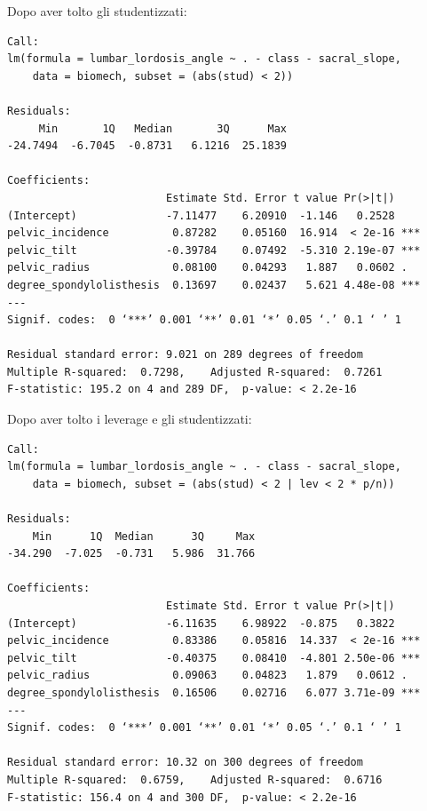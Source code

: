 \documentclass{beamer}
\begin{document}
\begin{frame}[fragile]
	Dopo aver tolto gli studentizzati:

	{\tiny
	\begin{verbatim}
Call:
lm(formula = lumbar_lordosis_angle ~ . - class - sacral_slope, 
    data = biomech, subset = (abs(stud) < 2))

Residuals:
     Min       1Q   Median       3Q      Max 
-24.7494  -6.7045  -0.8731   6.1216  25.1839 

Coefficients:
                         Estimate Std. Error t value Pr(>|t|)    
(Intercept)              -7.11477    6.20910  -1.146   0.2528    
pelvic_incidence          0.87282    0.05160  16.914  < 2e-16 ***
pelvic_tilt              -0.39784    0.07492  -5.310 2.19e-07 ***
pelvic_radius             0.08100    0.04293   1.887   0.0602 .  
degree_spondylolisthesis  0.13697    0.02437   5.621 4.48e-08 ***
---
Signif. codes:  0 ‘***’ 0.001 ‘**’ 0.01 ‘*’ 0.05 ‘.’ 0.1 ‘ ’ 1

Residual standard error: 9.021 on 289 degrees of freedom
Multiple R-squared:  0.7298,	Adjusted R-squared:  0.7261 
F-statistic: 195.2 on 4 and 289 DF,  p-value: < 2.2e-16
	\end{verbatim}
	}
\end{frame}





\begin{frame}[fragile]
	Dopo aver tolto i leverage e gli studentizzati:

	{\tiny
	\begin{verbatim}
Call:
lm(formula = lumbar_lordosis_angle ~ . - class - sacral_slope, 
    data = biomech, subset = (abs(stud) < 2 | lev < 2 * p/n))

Residuals:
    Min      1Q  Median      3Q     Max 
-34.290  -7.025  -0.731   5.986  31.766 

Coefficients:
                         Estimate Std. Error t value Pr(>|t|)    
(Intercept)              -6.11635    6.98922  -0.875   0.3822    
pelvic_incidence          0.83386    0.05816  14.337  < 2e-16 ***
pelvic_tilt              -0.40375    0.08410  -4.801 2.50e-06 ***
pelvic_radius             0.09063    0.04823   1.879   0.0612 .  
degree_spondylolisthesis  0.16506    0.02716   6.077 3.71e-09 ***
---
Signif. codes:  0 ‘***’ 0.001 ‘**’ 0.01 ‘*’ 0.05 ‘.’ 0.1 ‘ ’ 1

Residual standard error: 10.32 on 300 degrees of freedom
Multiple R-squared:  0.6759,	Adjusted R-squared:  0.6716 
F-statistic: 156.4 on 4 and 300 DF,  p-value: < 2.2e-16
	\end{verbatim}
	}
\end{frame}
\end{document}
